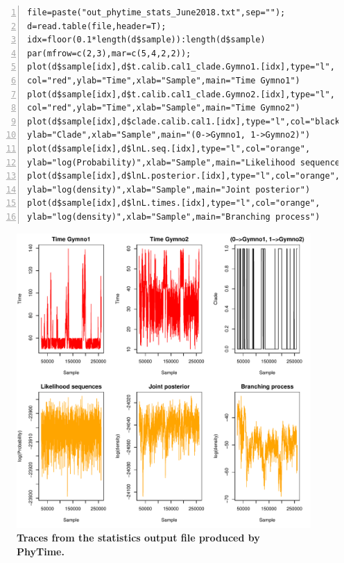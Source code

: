 \documentclass[a4paper,12pt]{article}
\begin{document}
\begin{Verbatim}[frame=single, label=R script to produce traces from the PhyTime statistics file, samepage=true, baselinestretch=0.5,
fontsize=\small, numbers=left]
file=paste("out_phytime_stats_June2018.txt",sep="");
d=read.table(file,header=T);
idx=floor(0.1*length(d$sample)):length(d$sample)
par(mfrow=c(2,3),mar=c(5,4,2,2));
plot(d$sample[idx],d$t.calib.cal1_clade.Gymno1.[idx],type="l",
col="red",ylab="Time",xlab="Sample",main="Time Gymno1")
plot(d$sample[idx],d$t.calib.cal1_clade.Gymno2.[idx],type="l",
col="red",ylab="Time",xlab="Sample",main="Time Gymno2")
plot(d$sample[idx],d$clade.calib.cal1.[idx],type="l",col="black",
ylab="Clade",xlab="Sample",main="(0->Gymno1, 1->Gymno2)")
plot(d$sample[idx],d$lnL.seq.[idx],type="l",col="orange",
ylab="log(Probability)",xlab="Sample",main="Likelihood sequences")
plot(d$sample[idx],d$lnL.posterior.[idx],type="l",col="orange",
ylab="log(density)",xlab="Sample",main="Joint posterior")
plot(d$sample[idx],d$lnL.times.[idx],type="l",col="orange",
ylab="log(density)",xlab="Sample",main="Branching process")
\end{Verbatim}


\begin{figure}
\begin{center}
\includegraphics[width=13.8cm]{./fig/phytimetrace}
\end{center}
\caption{{\bf Traces from the statistics output file produced by PhyTime.}} 
\label{fig:phytimetrace}
\end{figure}
\end{document}
